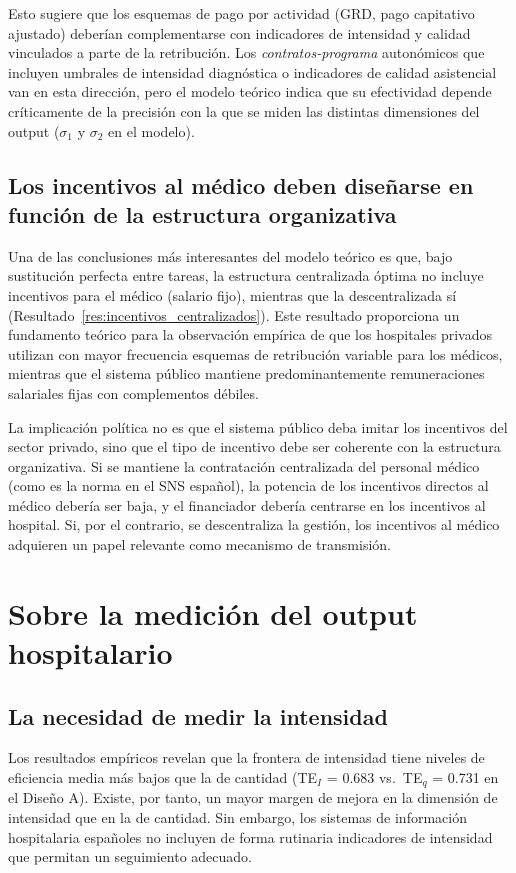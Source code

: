 Esto sugiere que los esquemas de pago por actividad (GRD, pago capitativo ajustado) deberían complementarse con indicadores de intensidad y calidad vinculados a parte de la retribución. Los \textit{contratos-programa} autonómicos que incluyen umbrales de intensidad diagnóstica o indicadores de calidad asistencial van en esta dirección, pero el modelo teórico indica que su efectividad depende críticamente de la precisión con la que se miden las distintas dimensiones del output ($\sigma_1$ y $\sigma_2$ en el modelo).

\subsection{Los incentivos al médico deben diseñarse en función de la estructura organizativa}

Una de las conclusiones más interesantes del modelo teórico es que, bajo sustitución perfecta entre tareas, la estructura centralizada óptima no incluye incentivos para el médico (salario fijo), mientras que la descentralizada sí (Resultado~\ref{res:incentivos_centralizados}). Este resultado proporciona un fundamento teórico para la observación empírica de que los hospitales privados utilizan con mayor frecuencia esquemas de retribución variable para los médicos, mientras que el sistema público mantiene predominantemente remuneraciones salariales fijas con complementos débiles.

La implicación política no es que el sistema público deba imitar los incentivos del sector privado, sino que el tipo de incentivo debe ser coherente con la estructura organizativa. Si se mantiene la contratación centralizada del personal médico (como es la norma en el SNS español), la potencia de los incentivos directos al médico debería ser baja, y el financiador debería centrarse en los incentivos al hospital. Si, por el contrario, se descentraliza la gestión, los incentivos al médico adquieren un papel relevante como mecanismo de transmisión.

\section{Sobre la medición del output hospitalario}

\subsection{La necesidad de medir la intensidad}

Los resultados empíricos revelan que la frontera de intensidad tiene niveles de eficiencia media más bajos que la de cantidad (TE$_I$ = 0.683 vs.\ TE$_q$ = 0.731 en el Diseño A). Existe, por tanto, un mayor margen de mejora en la dimensión de intensidad que en la de cantidad. Sin embargo, los sistemas de información hospitalaria españoles no incluyen de forma rutinaria indicadores de intensidad que permitan un seguimiento adecuado.

